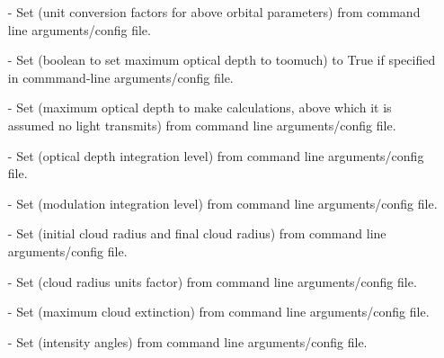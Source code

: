 \documentclass[letterpaper,12pt]{article}
\begin{document}
\begin{enumerate}[leftmargin=10pt, noitemsep, parsep=0pt, topsep=0ex]
\item[-] Set  (unit conversion factors for above orbital parameters) from command line arguments/config file.
\item[-] Set  (boolean to set maximum optical depth to toomuch) to True if specified in commmand-line arguments/config file.
\item[-] Set  (maximum optical depth to make calculations, above which it is assumed no light transmits) from command line arguments/config file.
\item[-] Set  (optical depth integration level) from command line arguments/config file.
\item[-] Set  (modulation integration level) from command line arguments/config file.
\item[-] Set  (initial cloud radius and final cloud radius) from command line arguments/config file.
\item[-] Set  (cloud radius units factor) from command line arguments/config file.
\item[-] Set  (maximum cloud extinction) from command line arguments/config file.
\item[-] Set  (intensity angles) from command line arguments/config file.
\end{enumerate}
\end{document}

